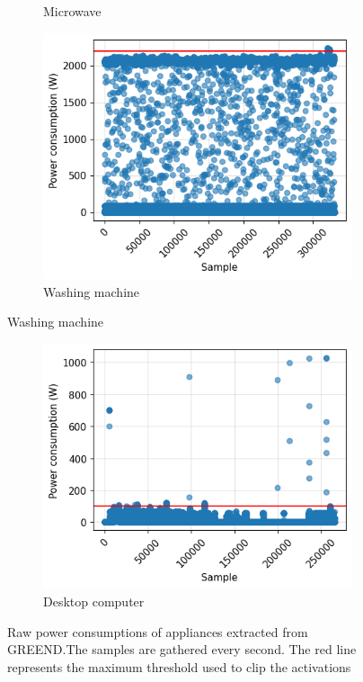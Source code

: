\begin{figure}
\begin{subfigure}{.5\textwidth}
    \caption{Microwave}%
    \label{fig:microwave}
  \end{subfigure}%
  \begin{subfigure}{.5\textwidth}
    \centering
    \includegraphics[width=.9\linewidth]{images/raw_consumptions/washing_machine.png}
    \caption{Washing machine}%
    \label{fig:washing_machine}
  \end{subfigure}
\end{figure}%
\begin{figure}\ContinuedFloat{}
  \begin{subfigure}{\textwidth}
    \centering
    \includegraphics[width=.45\linewidth]{images/raw_consumptions/desktop_computer.png}
    \caption{Desktop computer}%
    \label{fig:desktop_computer}
  \end{subfigure}
  \caption[Raw power consumptions of appliances extracted from GREEND]{Raw power consumptions of appliances extracted from GREEND.\@ The samples are gathered every second. The red line represents the maximum threshold used to clip the activations}%
  \label{fig:raw_power_consumptions_greend}
\end{figure}

